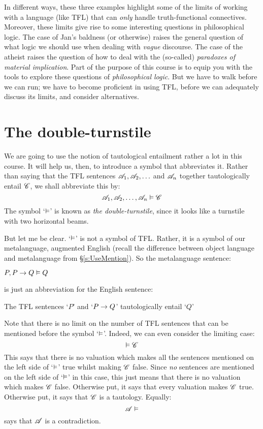 In different ways, these three examples highlight some of the limits of working with a language (like TFL) that can \emph{only} handle truth-functional connectives. Moreover, these limits give rise to some interesting questions in philosophical logic. The case of Jan's baldness (or otherwise) raises the general question of what logic we should use when dealing with \emph{vague} discourse. The case of the atheist raises the question of how to deal with the (so-called) \emph{paradoxes of material implication}. Part of the purpose of this course is to equip you with the tools to explore these questions of \emph{philosophical logic}. But we have to walk before we can run; we have to become proficient in using TFL, before we can adequately discuss its limits, and consider alternatives. 

\section{The double-turnstile}
We are going to use the notion of tautological entailment rather a lot in this course. It will help us, then, to introduce a symbol that abbreviates it. Rather than saying that the TFL sentences $\mathscr{A}_1, \mathscr{A}_2, \ldots$ and $\mathscr{A}_n$ together tautologically entail $\mathscr{C}$, we shall abbreviate this by:
	$$\mathscr{A}_1, \mathscr{A}_2, \ldots, \mathscr{A}_n \vDash \mathscr{C}$$
The symbol `$\vDash$' is known as \emph{the double-turnstile}, since it looks like a turnstile with two horizontal beams.

But let me be clear. `$\vDash$' is not a symbol of TFL. Rather, it is a symbol of our metalanguage, augmented English (recall the difference between object language and metalanguage from \S\ref{s:UseMention}). So the metalanguage sentence:
	\begin{ebullet}
		\item $P, P \rightarrow Q \vDash Q$
	\end{ebullet}
is just an abbreviation for the English sentence: 
	\begin{ebullet}
		\item The TFL sentences `$P$' and `$P \rightarrow Q$' tautologically entail `$Q$'
	\end{ebullet}
Note that there is no limit on the number of TFL sentences that can be mentioned before the symbol `$\vDash$'. Indeed, we can even consider the limiting case:
	$$\vDash \mathscr{C}$$
This says that there is no valuation which makes all the sentences mentioned on the left side of `$\vDash$' true whilst making $\mathscr{C}$ false. Since \emph{no} sentences are mentioned on the left side of `$\vDash$' in this case, this just means that there is no valuation which makes $\mathscr{C}$ false. Otherwise put, it says that every valuation makes $\mathscr{C}$ true. Otherwise put, it says that $\mathscr{C}$ is a tautology. Equally:
	$$\mathscr{A} \vDash$$
says that $\mathscr{A}$ is a contradiction.

